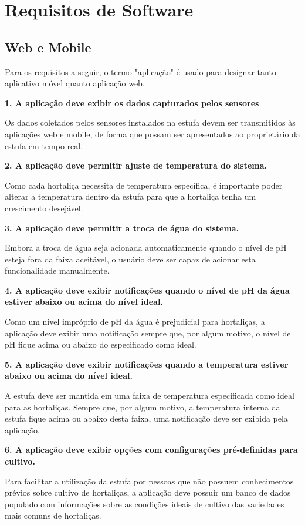 \section{Requisitos de Software}

\subsection{Web e Mobile}

Para os requisitos a seguir, o termo "aplicação" é usado para designar tanto aplicativo móvel quanto aplicação web.

\textbf{1. A aplicação deve exibir os dados capturados pelos sensores}

Os dados coletados pelos sensores instalados na estufa devem ser transmitidos às aplicações web e mobile, de forma que possam ser apresentados ao proprietário da estufa em tempo real.

\textbf{2. A aplicação deve permitir ajuste de temperatura do sistema.}

Como cada hortaliça necessita de temperatura específica, é importante poder alterar a temperatura dentro da estufa para que a hortaliça tenha um crescimento desejável.

\textbf{3. A aplicação deve permitir a troca de água do sistema.}

Embora a troca de água seja acionada automaticamente quando o nível de pH esteja fora da faixa aceitável, o usuário deve ser capaz de acionar esta funcionalidade manualmente.

\textbf{4. A aplicação deve exibir notificações quando o nível de pH da água estiver abaixo ou acima do nível ideal.}

Como um nível impróprio de pH da água é prejudicial para hortaliças, a aplicação deve exibir uma notificação sempre que, por algum motivo, o nível de pH fique acima ou abaixo do especificado como ideal. 

\textbf{5. A aplicação deve exibir notificações quando a temperatura estiver abaixo ou acima do nível ideal.}

A estufa deve ser mantida em uma faixa de temperatura especificada como ideal para as hortaliças. Sempre que, por algum motivo, a temperatura interna da estufa fique acima ou abaixo desta faixa, uma notificação deve ser exibida pela aplicação.

\textbf{6. A aplicação deve exibir opções com configurações pré-definidas para cultivo.}

Para facilitar a utilização da estufa por pessoas que não possuem conhecimentos prévios sobre cultivo de hortaliças, a aplicação deve possuir um banco de dados populado com informações sobre as condições ideais de cultivo das variedades mais comuns de hortaliças.


